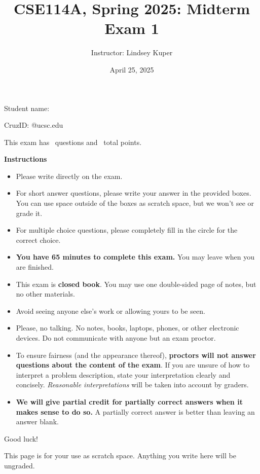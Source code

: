 \documentclass[addpoints,answers]{exam}
\title{CSE114A, Spring 2025: Midterm Exam 1}
\author{Instructor: Lindsey Kuper}
\date{April 25, 2025}
\begin{document}
\maketitle

\begin{coverpages}

\bigskip  

\noindent Student name: \hrulefill

\bigskip
\bigskip

\noindent CruzID: \hrulefill @ucsc.edu

\bigskip
\bigskip

\noindent This exam has \numquestions~questions and \numpoints~total points.

\bigskip
\bigskip

\noindent \textbf{Instructions}

\begin{itemize}
\item Please write directly on the exam.
\item For short answer questions, please write your answer in the provided boxes.  You can use space outside of the boxes as scratch space, but we won't see or grade it.
\item For multiple choice questions, please completely fill in the circle for the correct choice.
\item \textbf{You have 65 minutes to complete this exam.} You may leave when you are finished.
\item This exam is \textbf{closed book}.  You may use one double-sided page of notes, but no other materials.
\item Avoid seeing anyone else's work or allowing yours to be seen.
\item Please, no talking.  No notes, books, laptops, phones, or other electronic devices. Do not communicate with anyone but an exam proctor.
\item To ensure fairness (and the appearance thereof),
  \textbf{proctors will not answer questions about the content of the exam}. If you are unsure 
  of how to interpret a problem description, state your interpretation clearly and concisely. 
  \textit{Reasonable interpretations} will be taken into account by graders.
\item \textbf{We will give partial credit for partially correct answers when it makes sense to do so.} A partially correct answer is better than leaving an answer blank.
\end{itemize}
  
\bigskip

\noindent Good luck!

\newpage

This page is for your use as scratch space. Anything you write here will be ungraded.

\newpage  

\end{coverpages}
\end{document}
